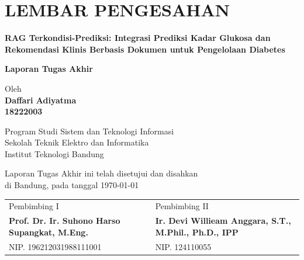 \chapter*{LEMBAR PENGESAHAN}

\begin{center}
    \vspace{1.5cm}

    {\large\bfseries RAG Terkondisi-Prediksi: Integrasi Prediksi Kadar Glukosa dan Rekomendasi Klinis Berbasis Dokumen untuk Pengelolaan Diabetes}\\

    \vspace{1.5cm}

    {\Large \textbf{Laporan Tugas Akhir}}\\

    \vspace{1.2cm}

    {\large Oleh}\\[0.3cm]

    \textbf{
        {\large Daffari Adiyatma}\\
        {\large 18222003}
    }\\

    \vspace{0.5cm}

    {\large Program Studi Sistem dan Teknologi Informasi}\\
    {\large Sekolah Teknik Elektro dan Informatika}\\
    {\large Institut Teknologi Bandung}\\

    \vspace{1.5cm}

    Laporan Tugas Akhir ini telah disetujui dan disahkan\\
    di Bandung, pada tanggal \today\\[1cm]


\begin{tabular}{>{\centering\arraybackslash}p{6.6cm}>{\centering\arraybackslash}p{6.6cm}}
  Pembimbing I & Pembimbing II \\[3cm]
  \textbf{Prof. Dr. Ir. Suhono Harso Supangkat, M.Eng.} & \textbf{Ir. Devi Willieam Anggara, S.T., M.Phil., Ph.D., IPP} \\[0.2cm]
  NIP. 196212031988111001 & NIP. 124110055
\end{tabular}

\end{center}
